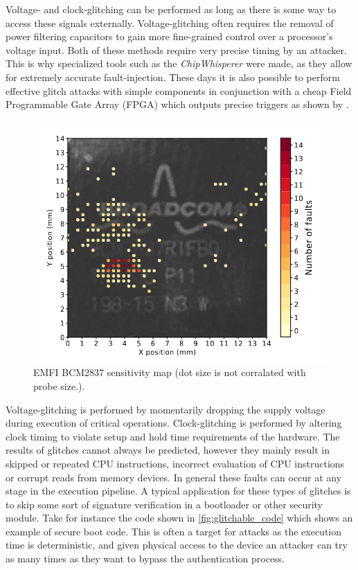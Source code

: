 Voltage- and clock-glitching can be performed as long as there is some way to access these signals externally. Voltage-glitching often requires the removal of power filtering capacitors to gain more fine-grained control over a processor's voltage input. Both of these methods require very precise timing by an attacker. This is why specialized tools such as the \textit{ChipWhisperer}\cite{chipWhisperer} were made, as they allow for extremely accurate fault-injection. These days it is also possible to perform effective glitch attacks with simple components in conjunction with a cheap Field Programmable Gate Array (FPGA) which outputs precise triggers as shown by \cite{hole_in_soc}. 

\begin{figure}[h!]
    \centering
    \includegraphics[scale=0.5]{docs/images/emfi_error_map.png}
    \caption{EMFI BCM2837 sensitivity map (dot size is not corralated with probe size.)\cite{emfi_injection}.}
    \label{fig:emfi_map}
\end{figure}

Voltage-glitching is performed by momentarily dropping the supply voltage during execution of critical operations. Clock-glitching is performed by altering clock timing to violate setup and hold time requirements of the hardware\cite{intro_to_FI}. The results of glitches cannot always be predicted, however they mainly result in skipped or repeated CPU instructions, incorrect evaluation of CPU instructions or corrupt reads from memory devices\cite{intro_to_FI}. In general these faults can occur at any stage in the execution pipeline. A typical application for these types of glitches is to skip some sort of signature verification in a bootloader or other security module. Take for instance the code shown in \autoref{fig:glitchable_code} which shows an example of secure boot code. This is often a target for attacks as the execution time is deterministic, and given physical access to the device an attacker can try as many times as they want to bypass the authentication process\cite{arm_presentation}. 


